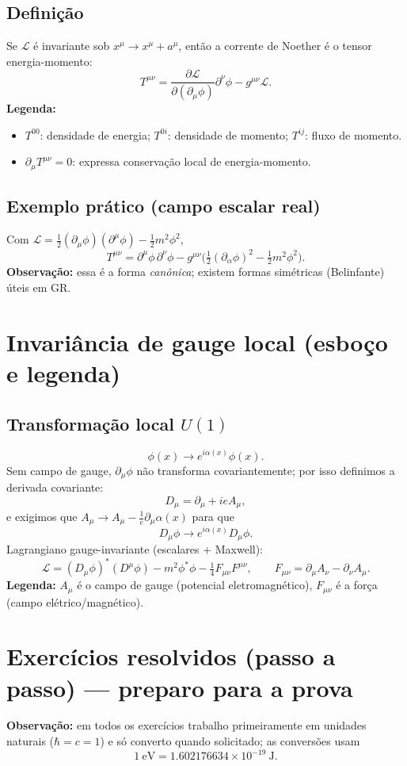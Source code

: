 \documentclass[12pt,a4paper]{article}
\begin{document}
\subsection{Definição}
Se $\mathcal{L}$ é invariante sob $x^\mu\to x^\mu+a^\mu$, então a corrente de Noether é o tensor energia-momento:
\[
T^{\mu\nu} = \frac{\partial\mathcal{L}}{\partial(\partial_\mu\phi)}\partial^\nu\phi - g^{\mu\nu}\mathcal{L}.
\]
\textbf{Legenda:}
\begin{itemize}
  \item $T^{00}$: densidade de energia; $T^{0i}$: densidade de momento; $T^{ij}$: fluxo de momento.
  \item $\partial_\mu T^{\mu\nu}=0$: expressa conservação local de energia-momento.
\end{itemize}

\subsection{Exemplo prático (campo escalar real)}
Com $\mathcal{L}=\tfrac12(\partial_\mu\phi)(\partial^\mu\phi)-\tfrac12 m^2\phi^2$,
\[
T^{\mu\nu} = \partial^\mu\phi\,\partial^\nu\phi - g^{\mu\nu}\Big(\tfrac12(\partial_\alpha\phi)^2 - \tfrac12 m^2\phi^2\Big).
\]
\textbf{Observação:} essa é a forma \emph{canônica}; existem formas simétricas (Belinfante) úteis em GR.

\section{Invariância de gauge local (esboço e legenda)}
\subsection{Transformação local $U(1)$}
\[
\phi(x)\to e^{i\alpha(x)}\phi(x).
\]
Sem campo de gauge, $\partial_\mu\phi$ não transforma covariantemente; por isso definimos a derivada covariante:
\[
D_\mu = \partial_\mu + i e A_\mu,
\]
e exigimos que $A_\mu\to A_\mu - \frac{1}{e}\partial_\mu\alpha(x)$ para que
\[
D_\mu\phi \to e^{i\alpha(x)}D_\mu\phi.
\]
Lagrangiano gauge-invariante (escalares + Maxwell):
\[
\mathcal{L} = (D_\mu\phi)^*(D^\mu\phi) - m^2\phi^*\phi - \tfrac14 F_{\mu\nu}F^{\mu\nu},\qquad F_{\mu\nu}=\partial_\mu A_\nu-\partial_\nu A_\mu.
\]
\textbf{Legenda:} $A_\mu$ é o campo de gauge (potencial eletromagnético), $F_{\mu\nu}$ é a força (campo elétrico/magnético).

\section{Exercícios resolvidos (passo a passo) --- preparo para a prova}
{\bf Observação:} em todos os exercícios trabalho primeiramente em unidades naturais ($\hbar=c=1$) e só converto quando solicitado; as conversões usam
\[
1\ \mathrm{eV} = 1.602176634\times10^{-19}\ \mathrm{J}.
\]
\end{document}
